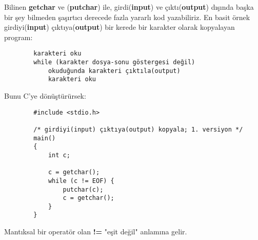 \documentclass[a4paper,12pt,oneside]{book}
\begin{document}
Bilinen \textbf{getchar} ve (\textbf{putchar}) ile, girdi(\textbf{input}) ve çıktı(\textbf{output}) dışında başka bir şey bilmeden şaşırtıcı derecede fazla yararlı kod yazabiliriz. En basit örnek girdiyi(\textbf{input}) çıktıya(\textbf{output}) bir kerede bir karakter olarak kopyalayan program:
\begin{lstlisting}
		karakteri oku
		while (karakter dosya-sonu göstergesi değil)
			okuduğunda karakteri çıktıla(output)
			karakteri oku
\end{lstlisting}
Bunu C'ye dönüştürürsek:
\begin{lstlisting}
		#include <stdio.h>

		/* girdiyi(input) çıktıya(output) kopyala; 1. versiyon */
		main()
		{
			int c;

			c = getchar();
			while (c != EOF) {
				putchar(c);
				c = getchar();
			}
		}
\end{lstlisting}
Mantıksal bir operatör olan \textbf{ !=} "eşit değil" anlamına gelir.
\end{document}
